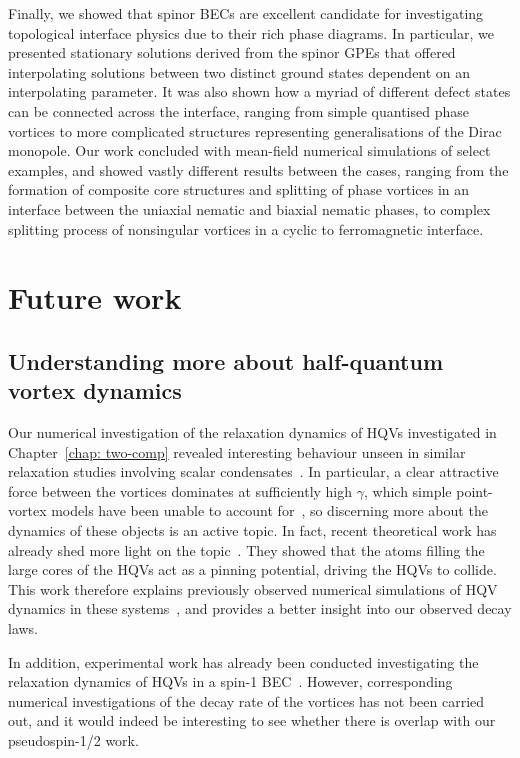 Finally, we showed that spinor BECs are excellent candidate for investigating
topological interface physics due to their rich phase diagrams.
In particular, we presented stationary solutions derived from the spinor GPEs
that offered interpolating solutions between two distinct ground states
dependent on an interpolating parameter.
It was also shown how a myriad of different defect states can be connected
across the interface, ranging from simple quantised phase vortices to more
complicated structures representing generalisations of the Dirac monopole.
Our work concluded with mean-field numerical simulations of select examples,
and showed vastly different results between the cases, ranging from the
formation of composite core structures and splitting of phase vortices in an
interface between the uniaxial nematic and biaxial nematic phases, to complex
splitting process of nonsingular vortices in a cyclic to ferromagnetic
interface.

\section{Future work}

\subsection{Understanding more about half-quantum vortex dynamics}
Our numerical investigation of the relaxation dynamics of HQVs investigated
in Chapter~\ref{chap: two-comp} revealed interesting behaviour unseen in similar
relaxation studies involving scalar condensates~\cite{Karl2017}.
In particular, a clear attractive force between the vortices dominates at
sufficiently high \(\gamma \), which simple point-vortex models have been unable
to account for~\cite{Eto2011,Kasamatsu2016}, so discerning more about the
dynamics of these objects is an active topic.
In fact, recent theoretical work has already shed more light on the
topic~\cite{Richaud2023}.
They showed that the atoms filling the large cores of the HQVs act as a pinning
potential, driving the HQVs to collide.
This work therefore explains previously observed numerical simulations of HQV
dynamics in these systems~\cite{Eto2011, Kasamatsu2016}, and provides a
better insight into our observed decay laws.

In addition, experimental work has already been conducted investigating the
relaxation dynamics of HQVs in a spin-1 BEC~\cite{Seo2016}.
However, corresponding numerical investigations of the decay rate of the
vortices has not been carried out, and it would indeed be interesting to see
whether there is overlap with our pseudospin-1/2 work.

